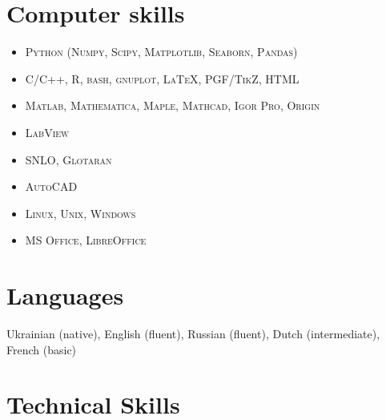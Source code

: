 \documentclass[11pt,letterpaper,sans]{moderncv} %
\begin{document}
\section{Computer skills}
\begin{itemize}
	\item \textsc{Python (Numpy, Scipy, Matplotlib, Seaborn, Pandas)}
	\item \textsc{C/C++, R, bash, gnuplot, \LaTeX, PGF/TikZ, HTML}
	\item \textsc{Matlab, Mathematica, Maple, Mathcad, Igor Pro, Origin}
	\item \textsc{LabView}
	\item \textsc{SNLO, Glotaran}
	\item \textsc{AutoCAD}
	\item \textsc{Linux, Unix, Windows}
	\item \textsc{MS Office, LibreOffice}
\end{itemize}








\section{Languages}

Ukrainian (native), English (fluent), Russian (fluent), Dutch (intermediate), French (basic)









\section{Technical Skills}
\end{document}
